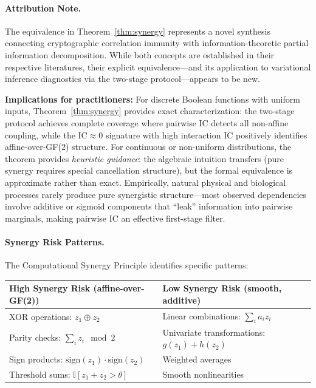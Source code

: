 \documentclass[10pt]{article} %
\theoremstyle{plain}
\theoremstyle{definition}
\begin{document}
\paragraph{Attribution Note.} The equivalence in Theorem~\ref{thm:synergy} represents a novel synthesis connecting cryptographic correlation immunity \citep{siegenthaler1984correlation} with information-theoretic partial information decomposition. While both concepts are established in their respective literatures, their explicit equivalence---and its application to variational inference diagnostics via the two-stage protocol---appears to be new.

\textbf{Implications for practitioners:} For discrete Boolean functions with uniform inputs, Theorem~\ref{thm:synergy} provides exact characterization: the two-stage protocol achieves complete coverage where pairwise IC detects all non-affine coupling, while the IC$\approx$0 signature with high interaction IC positively identifies affine-over-GF(2) structure. For continuous or non-uniform distributions, the theorem provides \emph{heuristic guidance}: the algebraic intuition transfers (pure synergy requires special cancellation structure), but the formal equivalence is approximate rather than exact. Empirically, natural physical and biological processes rarely produce pure synergistic structure---most observed dependencies involve additive or sigmoid components that ``leak'' information into pairwise marginals, making pairwise IC an effective first-stage filter.

\paragraph{Synergy Risk Patterns.} The Computational Synergy Principle identifies specific patterns:

\begin{center}
\begin{tabular}{p{}p{}}
\toprule
\textbf{High Synergy Risk} (affine-over-GF(2)) & \textbf{Low Synergy Risk} (smooth, additive) \\
\midrule
XOR operations: $z_1 \oplus z_2$ & Linear combinations: $\sum_i a_i z_i$ \\
Parity checks: $\sum_i z_i \mod 2$ & Univariate transformations: $g(z_1) + h(z_2)$ \\
Sign products: $\text{sign}(z_1) \cdot \text{sign}(z_2)$ & Weighted averages \\
Threshold sums: $\mathbb{I}[z_1 + z_2 > \theta]$ & Smooth nonlinearities \\
\bottomrule
\end{tabular}
\end{center}
\end{document}
